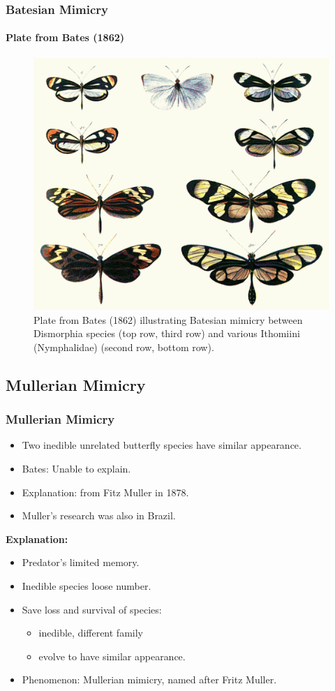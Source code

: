 \frame
{
	\frametitle{Batesian Mimicry}
	\framesubtitle{Plate from Bates (1862)}
	
	\begin{figure}[H]
		\centering
		\includegraphics[scale=0.6]{../tex/images/Batesplate_ArM}
		\caption{Plate from Bates (1862) illustrating Batesian mimicry between Dismorphia species (top row, third row) and various Ithomiini (Nymphalidae) (second row, bottom row).}
		\label{fig:batesian-butterfly}
	\end{figure}
}

\subsection{Mullerian Mimicry}

\frame
{
	\frametitle{Mullerian Mimicry}
	
	\begin{itemize}
		\item Two inedible unrelated butterfly species have similar appearance. 
		\item Bates: Unable to explain.
		\item Explanation: from Fitz Muller in 1878.
		\item Muller's research was also in Brazil.
	\end{itemize}

\textbf{Explanation:}
	\begin{itemize}
		\item Predator's limited memory.
		\item Inedible species loose number.
		\item Save loss and survival of species:
			\begin{itemize}
				\item inedible, different family 
				\item evolve to have similar appearance.
			\end{itemize}
		\item Phenomenon: Mullerian mimicry, named after Fritz Muller.
	\end{itemize}
}

